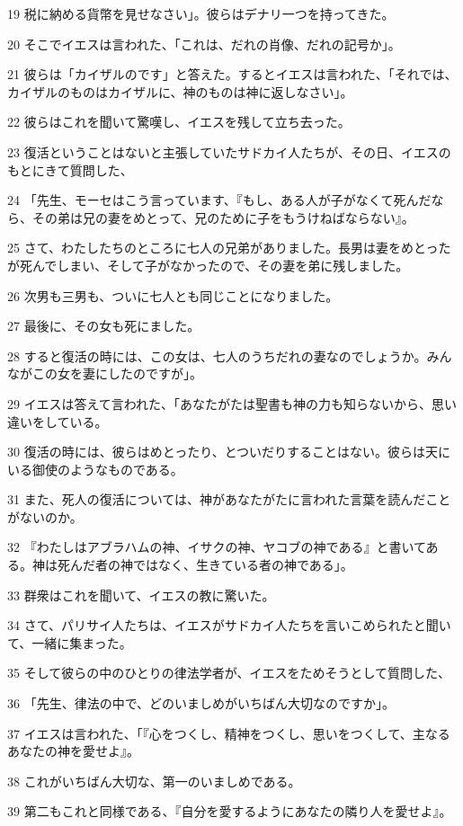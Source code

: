 \par 19 税に納める貨幣を見せなさい」。彼らはデナリ一つを持ってきた。
\par 20 そこでイエスは言われた、「これは、だれの肖像、だれの記号か」。
\par 21 彼らは「カイザルのです」と答えた。するとイエスは言われた、「それでは、カイザルのものはカイザルに、神のものは神に返しなさい」。
\par 22 彼らはこれを聞いて驚嘆し、イエスを残して立ち去った。
\par 23 復活ということはないと主張していたサドカイ人たちが、その日、イエスのもとにきて質問した、
\par 24 「先生、モーセはこう言っています、『もし、ある人が子がなくて死んだなら、その弟は兄の妻をめとって、兄のために子をもうけねばならない』。
\par 25 さて、わたしたちのところに七人の兄弟がありました。長男は妻をめとったが死んでしまい、そして子がなかったので、その妻を弟に残しました。
\par 26 次男も三男も、ついに七人とも同じことになりました。
\par 27 最後に、その女も死にました。
\par 28 すると復活の時には、この女は、七人のうちだれの妻なのでしょうか。みんながこの女を妻にしたのですが」。
\par 29 イエスは答えて言われた、「あなたがたは聖書も神の力も知らないから、思い違いをしている。
\par 30 復活の時には、彼らはめとったり、とついだりすることはない。彼らは天にいる御使のようなものである。
\par 31 また、死人の復活については、神があなたがたに言われた言葉を読んだことがないのか。
\par 32 『わたしはアブラハムの神、イサクの神、ヤコブの神である』と書いてある。神は死んだ者の神ではなく、生きている者の神である」。
\par 33 群衆はこれを聞いて、イエスの教に驚いた。
\par 34 さて、パリサイ人たちは、イエスがサドカイ人たちを言いこめられたと聞いて、一緒に集まった。
\par 35 そして彼らの中のひとりの律法学者が、イエスをためそうとして質問した、
\par 36 「先生、律法の中で、どのいましめがいちばん大切なのですか」。
\par 37 イエスは言われた、「『心をつくし、精神をつくし、思いをつくして、主なるあなたの神を愛せよ』。
\par 38 これがいちばん大切な、第一のいましめである。
\par 39 第二もこれと同様である、『自分を愛するようにあなたの隣り人を愛せよ』。
